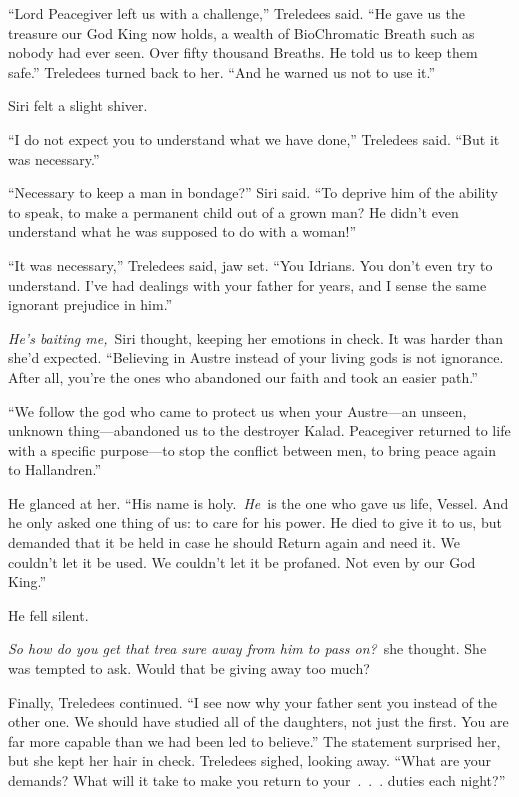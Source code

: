 “Lord Peacegiver left us with a challenge,” Treledees said. “He gave us the treasure our God King now holds, a wealth of BioChromatic Breath such as nobody had ever seen. Over fifty thousand Breaths. He told us to keep them safe.” Treledees turned back to her. “And he warned us not to use it.”

Siri felt a slight shiver.

“I do not expect you to understand what we have done,” Treledees said. “But it was necessary.”

“Necessary to keep a man in bondage?” Siri said. “To deprive him of the ability to speak, to make a permanent child out of a grown man? He didn’t even understand what he was supposed to do with a woman!”

“It was necessary,” Treledees said, jaw set. “You Idrians. You don’t even try to understand. I’ve had dealings with your father for years, and I sense the same ignorant prejudice in him.”

\textit{He’s baiting me,}~Siri thought, keeping her emotions in check. It was harder than she’d expected. “Believing in Austre instead of your living gods is not ignorance. After all, you’re the ones who abandoned our faith and took an easier path.”

“We follow the god who came to protect us when your Austre—an unseen, unknown thing—abandoned us to the destroyer Kalad. Peacegiver returned to life with a specific purpose—to stop the conflict between men, to bring peace again to Hallandren.”

He glanced at her. “His name is holy.~\textit{He}~is the one who gave us life, Vessel. And he only asked one thing of us: to care for his power. He died to give it to us, but demanded that it be held in case he should Return again and need it. We couldn’t let it be used. We couldn’t let it be profaned. Not even by our God King.”

He fell silent.

\textit{So how do you get that trea sure away from him to pass on?}~she thought. She was tempted to ask. Would that be giving away too much?

Finally, Treledees continued. “I see now why your father sent you instead of the other one. We should have studied all of the daughters, not just the first. You are far more capable than we had been led to believe.” The statement surprised her, but she kept her hair in check. Treledees sighed, looking away. “What are your demands? What will it take to make you return to your~.~.~. duties each night?”

